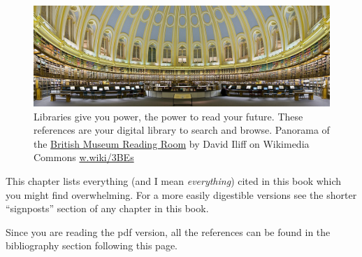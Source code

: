 \documentclass[
]{book}
\begin{document}
\begin{figure}

{\centering \includegraphics[width=1\linewidth]{images/Libraries_Give_Us_Power} 

}

\caption{Libraries give you power, the power to read your future. These references are your digital library to search and browse. Panorama of the \href{https://en.wikipedia.org/wiki/British_Museum_Reading_Room}{British Museum Reading Room} by David Iliff on Wikimedia Commons \href{https://w.wiki/3BEs}{w.wiki/3BEs}}\label{fig:library-power-fig}
\end{figure}



This chapter lists everything (and I mean \emph{everything}) cited in this book which you might find overwhelming. For a more easily digestible versions see the shorter ``signposts'' section of any chapter in this book.

Since you are reading the pdf version, all the references can be found in the bibliography section following this page.

  
\end{document}
